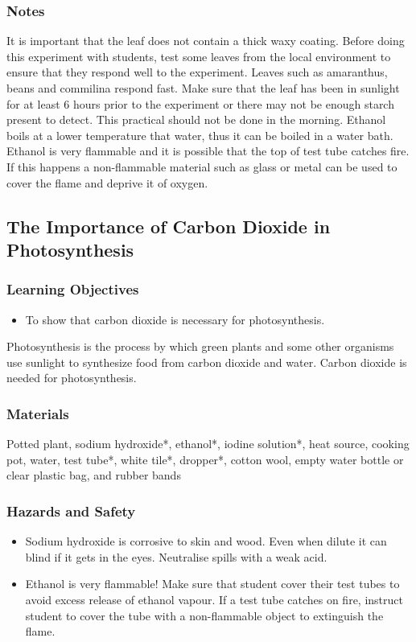 \subsubsection*{Notes}
It is important that the leaf does not contain a thick waxy coating. Before doing this experiment with students, test some leaves from the local environment to ensure that they respond well to the experiment. Leaves such as amaranthus, beans and commilina respond fast. Make sure that the leaf has been in sunlight for at least 6 hours prior to the experiment or there may not be enough starch present to detect. This practical should not be done in the morning.
Ethanol boils at a lower temperature that water, thus it can be boiled in a water bath. Ethanol is very flammable and it is possible that the top of test tube catches fire. If this happens a non-flammable material such as glass or metal can be used to cover the flame and deprive it of oxygen.


\subsection{The Importance of Carbon Dioxide in Photosynthesis}

\subsubsection*{Learning Objectives}
\begin{itemize}
\item{To show that carbon dioxide is necessary for photosynthesis.}
\end{itemize}


Photosynthesis is the process by which green plants and some other organisms use sunlight to synthesize food from carbon dioxide and water. Carbon dioxide is needed for photosynthesis.

\subsubsection*{Materials}
Potted plant, sodium hydroxide*, ethanol*, iodine solution*, heat source, cooking pot, water, test tube*, white tile*, dropper*, cotton wool, empty water bottle or clear plastic bag, and rubber bands

\subsubsection*{Hazards and Safety}
\begin{itemize}
\item{Sodium hydroxide is corrosive to skin and wood. Even when dilute it can blind if it gets in the eyes. Neutralise spills with a weak acid.}
\item{Ethanol is very flammable! Make sure that student cover their test tubes to avoid excess release of ethanol vapour. If a test tube catches on fire, instruct student to cover the tube with a non-flammable object to extinguish the flame.}
\end{itemize}

